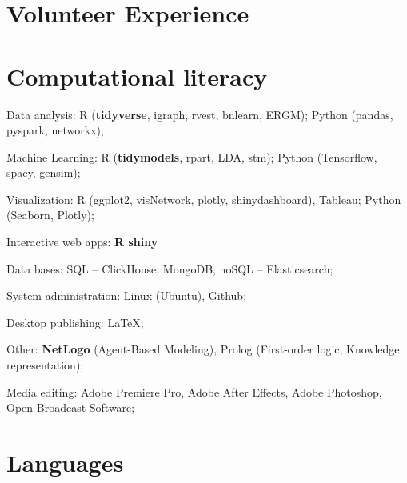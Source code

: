 \documentclass[a4paper, extended]{adcv}
\begin{document}
\section{Volunteer Experience}\label{sec:projects}

\begin{adcvtabletwo}

  \adcvrowskip

\end{adcvtabletwo}

\section{Computational literacy}

Data analysis: R (\textbf{tidyverse}, igraph, rvest, bnlearn, ERGM); Python (pandas, pyspark, networkx);

Machine Learning: R (\textbf{tidymodels}, rpart, LDA, stm); Python (Tensorflow, spacy, gensim);

Visualization: R (ggplot2, visNetwork, plotly, shinydashboard), Tableau;  Python (Seaborn, Plotly);

Interactive web apps: \textbf{R shiny}

Data bases: SQL -- ClickHouse, MongoDB, noSQL -- Elasticsearch;

System administration: Linux (Ubuntu), \href{https://github.com/vvseva/}{Github};

Desktop publishing: \LaTeX;
  
Other: \textbf{NetLogo} (Agent-Based Modeling), Prolog (First-order logic, Knowledge representation);
  
Media editing: Adobe Premiere Pro, Adobe After Effects, Adobe Photoshop, Open Broadcast Software;
\fi

\section{Languages}
\end{document}
